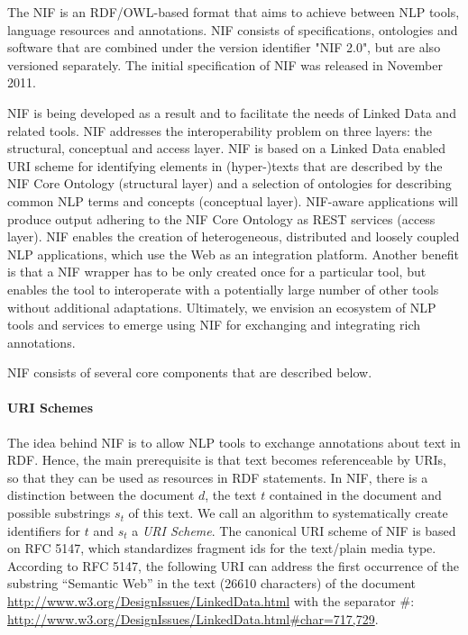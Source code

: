 \documentclass[thesis=M,english,hidelinks]{FITthesis}[2019/12/23]
\begin{document}
The \gls{NIF} is an \gls{RDF}/\gls{OWL}-based format that aims to achieve between \gls{NLP} tools, language resources and annotations\cite{nlp_cite}. NIF consists of specifications, ontologies and software  that are combined under the  version identifier "NIF 2.0", but are also versioned separately. The initial specification of \gls{NIF} was released in November 2011.

\gls{NIF} is being developed as a result and to facilitate the needs of Linked Data and related tools.  NIF addresses the interoperability problem on three layers: the structural, conceptual and access layer. NIF is based on a Linked Data enabled URI scheme for identifying elements in (hyper-)texts that are described by the NIF Core Ontology (structural layer) and a selection of ontologies for describing common NLP terms and concepts (conceptual layer). NIF-aware applications will produce output adhering to the NIF Core Ontology as REST services (access layer). NIF enables the creation of heterogeneous, distributed and loosely coupled NLP applications, which use the Web as an integration platform. Another benefit is
that a NIF wrapper has to be only created once for a particular tool, but enables the tool to interoperate with a potentially large number of other tools without additional adaptations. Ultimately, we envision an ecosystem of NLP tools and services to emerge using NIF for exchanging and integrating rich annotations.

\gls{NIF} consists of several core components that are described below.

\paragraph{URI Schemes}

The idea behind NIF is to allow NLP tools to exchange annotations about text in RDF. Hence, the main prerequisite is that text becomes referenceable by URIs, so that they can be used as resources in RDF statements\cite{linked_data_uri}\cite{workflow_modularity}. In NIF, there is a distinction between the document $d$, the text $t$ contained in the document and possible substrings $s_{t}$ of this text.  We call an algorithm to systematically create identifiers for $t$ and $s_{t}$ a \textit{URI Scheme}.  The canonical URI scheme of NIF is based on RFC 5147\cite{nif_rdf}, which standardizes fragment ids for the text/plain media type. According to RFC 5147, the following URI can address the first occurrence of the substring “Semantic Web” in the
text (26610 characters) of the document \url{http://www.w3.org/DesignIssues/LinkedData.html} with the separator \#: \url{http://www.w3.org/DesignIssues/LinkedData.html\#char=717,729}.
\end{document}

